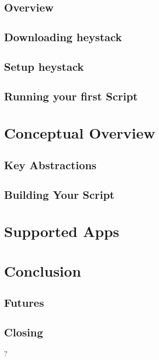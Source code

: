 \documentclass{report}
\begin{document}
    \section{Overview}
    \section{Downloading heystack}
    \section{Setup heystack}
    \section{Running your first Script}

  \chapter{Conceptual Overview}
    \section{Key Abstractions}
    \section{Building Your Script}

  \chapter{Supported Apps}

  \chapter{Conclusion}
    \section{Futures}
    \section{Closing}
    ?
\end{document}
